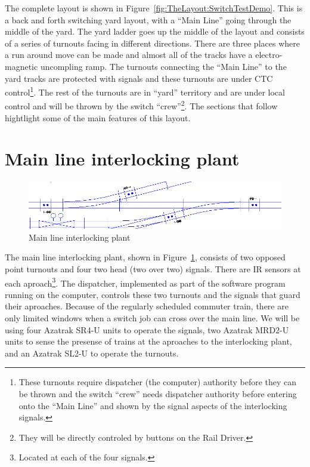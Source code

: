 The complete layout is shown in
Figure~\ref{fig:TheLayout:SwitchTestDemo}. This is a back and forth
switching yard layout, with a ``Main Line'' going through the middle of
the yard.  The yard ladder goes up the middle of the layout and
consists of a series of turnouts facing in different directions. There
are three places where a run around move can be made and almost all of
the tracks have a electro-magnetic uncompling ramp.  The turnouts
connecting the ``Main Line'' to the yard tracks are protected with
signals and these turnouts are under CTC control\footnote{These
turnouts require dispatcher (the computer) authority before they can be
thrown and the switch ``crew'' needs dispatcher authority before
entering onto the ``Main Line'' and shown by the signal aspects of the
interlocking signals.}.  The rest of the turnouts are in ``yard''
territory and are under local control and will be thrown by the switch
``crew''\footnote{They will be directly controled by buttons on the
Rail Driver.}. The sections that follow hightlight some of
the main features of this layout.

\section{Main line interlocking plant}

\begin{figure}[hbpt]
\begin{centering}
\includegraphics[width=5in]{SwitchTestDemo-MainInterlocking.png}
\caption{Main line interlocking plant}
\label{fig:TheLayout:SwitchTestDemo-MainInterlocking}
\end{centering}
\end{figure}
The main line interlocking plant, shown in
Figure~\ref{fig:TheLayout:SwitchTestDemo-MainInterlocking}, consists of
two opposed point turnouts and four two head (two over two) signals.
There are IR sensors at each aproach\footnote{Located at each of the
four signals.}.  The dispatcher, implemented as part of the software
program running on the computer, controls these two turnouts and the
signals that guard their aproaches.  Because of the regularly scheduled
commuter train, there are only limited windows when a switch job can
cross over the main line.  We will be using four Azatrak SR4-U units to
operate the signals, two Azatrak MRD2-U units to sense the presense of
trains at the aproaches to the interlocking plant, and an Azatrak SL2-U
to operate the turnouts.

